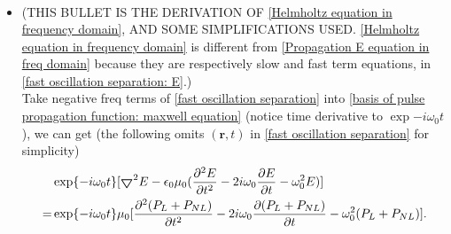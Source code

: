 \documentclass[12pt]{extarticle}
\numberwithin{equation}{section}
\numberwithin{figure}{section}
\numberwithin{table}{section}
\newcommand{\<}{\langle}
\renewcommand{\>}{\rangle}
\theoremstyle{definition}
\newcommand{\Lap}{\boldsymbol{\bigtriangledown}}
\begin{document}
\begin{itemize}
\begin{subequations}
\begin{align}
                \end{align}
                \end{subequations}
            \item \MakeUppercase{(This bullet is the derivation of }\autoref{Helmholtz equation in frequency domain}, \MakeUppercase{and some simplifications used.} \autoref{Helmholtz equation in frequency domain} is different from \autoref{Propagation E equation in freq domain} because they are respectively slow and fast term equations, in \autoref{fast oscillation separation: E}.)\\Take negative freq terms of \autoref{fast oscillation separation} into \autoref{basis of pulse propagation function: maxwell equation} (notice time derivative to $\exp{-i\omega_0 t}$), we can get (the following omits $(\boldsymbol{r},t)$ in \autoref{fast oscillation separation} for simplicity)
                \begin{equation}
                \begin{split}
                    &\exp{-i\omega_0 t}[\Lap^2 E-\epsilon_0 \mu_0(\pdv[2]{E}{t}-2i\omega_0\pdv{E}{t}-\omega_0^2 E)]\\
                    =&\exp{-i\omega_0 t}\mu_0[\pdv[2]{(P_L+P_{NL})}{t}-2i\omega_0\pdv{(P_L+P_{NL})}{t}-\omega_0^2(P_L+P_{NL})].
                \end{split}
                \label{slow oscillatiing term propagation equation derive in section 2.3.1}
                \end{equation}
                
           

\end{itemize}
\end{document}
